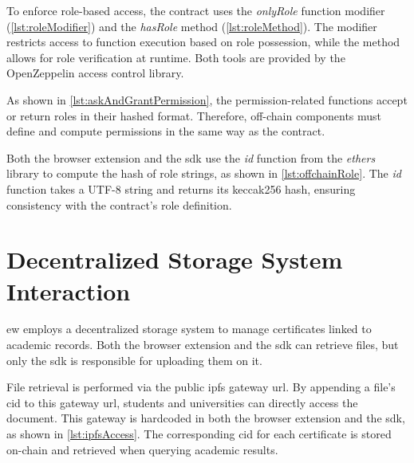To enforce role-based access, the contract uses the \textit{onlyRole} function modifier (\cref{lst:roleModifier}) and the \textit{hasRole} method (\cref{lst:roleMethod}). The modifier restricts access to function execution based on role possession, while the method allows for role verification at runtime. Both tools are provided by the OpenZeppelin access control library.



As shown in \cref{lst:askAndGrantPermission}, the permission-related functions accept or return roles in their \gls{hash}ed format. Therefore, off-chain components must define and compute permissions in the same way as the contract.


Both the browser extension and the \acrshort{sdk} use the \textit{id} function from the \textit{ethers} library to compute the \gls{hash} of role strings, as shown in \cref{lst:offchainRole}. The \textit{id} function takes a UTF-8 string and returns its \Gls{keccak256} \gls{hash}, ensuring consistency with the contract's role definition.   


\section{Decentralized Storage System Interaction}
\acrlong{ew} employs a decentralized storage system to manage certificates linked to academic records. Both the browser extension and the \acrshort{sdk} can retrieve files, but only the \acrshort{sdk} is responsible for uploading them on it.

File retrieval is performed via the public \acrshort{ipfs} gateway \acrshort{url}. By appending a file's \acrshort{cid} to this gateway \acrshort{url}, students and universities can directly access the document. This gateway is hardcoded in both the browser extension and the \acrshort{sdk}, as shown in \cref{lst:ipfsAccess}. The corresponding \acrshort{cid} for each certificate is stored on-chain and retrieved when querying academic results.



